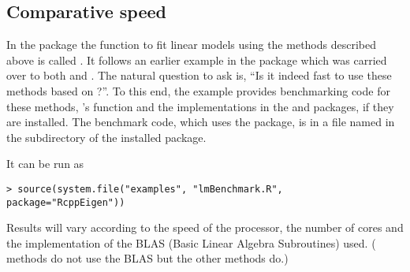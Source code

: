 \documentclass[shortnames,article]{jss}
\begin{document}
\subsection{Comparative speed}

In the  package the  function to fit linear
models using the methods described above is called . It follows
an earlier example in the  package which was carried over to both
 and . The natural question to ask is, ``Is it indeed fast to use these methods
based on ?''.  To this end, the example provides benchmarking code for these
methods, 's  function and the 
implementations in the  \citep{CRAN:RcppArmadillo}
and  \citep{CRAN:RcppGSL} packages, if they are
installed.  The benchmark code, which uses the 
\citep{CRAN:rbenchmark} package, is in a file named
 in the  subdirectory of the
installed  package.


It can be run as
\begin{verbatim}
> source(system.file("examples", "lmBenchmark.R", package="RcppEigen"))
\end{verbatim}
Results will vary according to the speed of the processor, the
number of cores and the implementation of the BLAS (Basic Linear
Algebra Subroutines) used.  ( methods do not use the BLAS
but the other methods do.)  
\end{document}
